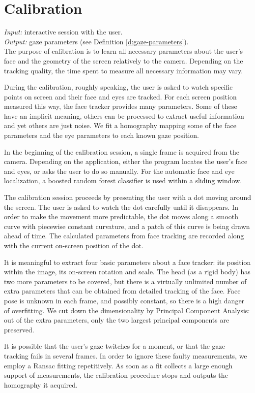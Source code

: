 
\section{Calibration}

\textit{Input:} interactive session with the user.\\
\textit{Output:} gaze parameters (see Definition \ref{d:gaze-parameters}).\\

The purpose of calibration is to learn all necessary parameters about the user's face and the geometry of the screen relatively to the camera.
Depending on the tracking quality, the time spent to measure all necessary information may vary.

During the calibration, roughly speaking, the user is asked to watch specific points on screen and their face and eyes are tracked.
For each screen position measured this way, the face tracker provides many parameters.
Some of these have an implicit meaning, others can be processed to extract useful information and yet others are just noise.
We fit a homography mapping some of the face parameters and the eye parameters to each known gaze position.

In the beginning of the calibration session, a single frame is acquired from the camera.
Depending on the application, either the program locates the user's face and eyes, or asks the user to do so manually.
For the automatic face and eye localization, a boosted random forest classifier is used within a sliding window.

The calibration session proceeds by presenting the user with a dot moving around the screen.
The user is asked to watch the dot carefully until it disappears.
In order to make the movement more predictable, the dot moves along a smooth curve with piecewise constant curvature, and a patch of this curve is being drawn ahead of time.
The calculated parameters from face tracking are recorded along with the current on-screen position of the dot.

It is meaningful to extract four basic parameters about a face tracker: its position within the image, its on-screen rotation and scale.
The head (as a rigid body) has two more parameters to be covered, but there is a virtually unlimited number of extra parameters that can be obtained from detailed tracking of the face.
Face pose is unknown in each frame, and possibly constant, so there is a high danger of overfitting.
We cut down the dimensionality by Principal Component Analysis: out of the extra parameters, only the two largest principal components are preserved.

It is possible that the user's gaze twitches for a moment, or that the gaze tracking fails in several frames.
In order to ignore these faulty measurements, we employ a Ransac fitting repetitively.
As soon as a fit collects a large enough support of measurements, the calibration procedure stops and outputs the homography it acquired.

